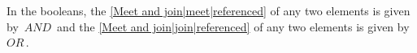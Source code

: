 In the booleans, the \ref{Meet and join|meet|referenced} of any two elements is given by \,$AND$\, and the \ref{Meet and join|join|referenced} of any two elements is given by \,$OR$\,.